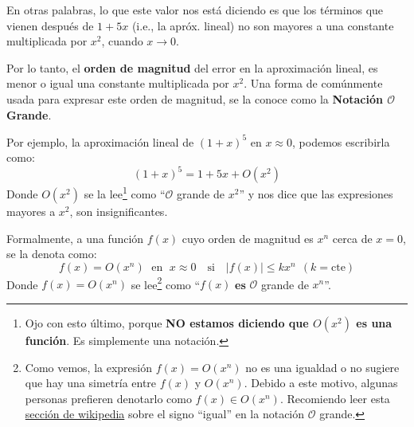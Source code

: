 \documentclass[12pt]{article}
\begin{document}
En otras palabras, lo que este valor nos está diciendo es que los términos que vienen después de $1 + 5x$ (i.e., la apróx. lineal) no son mayores a una constante multiplicada por $x^{2}$, cuando $x \to 0$.

Por lo tanto, el \textbf{orden de magnitud} del error en la aproximación lineal, es menor o igual una constante multiplicada por $x^{2}$. Una forma de comúnmente usada para expresar este orden de magnitud, se la conoce como la \textbf{Notación $\mathcal{O}$ Grande}.

Por ejemplo, la aproximación lineal de $(1 + x)^{5}$ en $x \approx 0$, podemos escribirla como:
\[(1 + x)^{5} = 1 + 5x + O(x^{2})\]
Donde $O(x^{2})$ se la lee\footnote{Ojo con esto último, porque \textbf{NO estamos diciendo que $O(x^{2})$ es una función}. Es simplemente una notación.} como ``$\mathcal{O}$ grande de $x^{2}$'' y  nos dice que las expresiones mayores a $x^{2}$, son insignificantes.

Formalmente, a una función $f(x)$ cuyo orden de magnitud es $x^{n}$ cerca de $x = 0$, se la denota como:
\[f(x) = O(x^{n}) \; \text{ en } \; x \approx 0 \quad \text{si} \quad |f(x)| \leq kx^{n} \: \: (k = \text{cte})\]
Donde $f(x) = O(x^{n})$ se lee\footnote{Como vemos, la expresión $f(x) = O(x^{n})$ no es una igualdad o no sugiere que hay una simetría entre $f(x)$ y $O(x^{n})$. Debido a este motivo, algunas personas prefieren denotarlo como $f(x) \in O(x^{n})$. Recomiendo leer esta \href{https://en.wikipedia.org/wiki/Big_O_notation\#Equals_sign}{sección de wikipedia} sobre el signo ``igual'' en la notación $\mathcal{O}$ grande.} como ``$f(x)$ \textbf{es} $\mathcal{O}$ grande de $x^{n}$''.

\newpage


\end{document}
